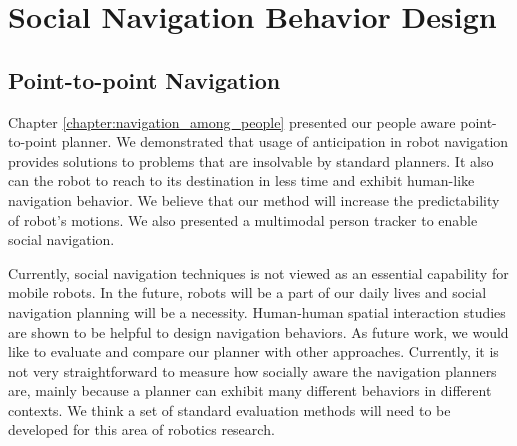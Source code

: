 \documentclass[12pt]{gatech-thesis}
\begin{document}





\section{Social Navigation Behavior Design}


\subsection{Point-to-point Navigation}

Chapter \ref{chapter:navigation_among_people} presented our people aware point-to-point planner. We demonstrated that usage of anticipation in robot navigation provides solutions to problems that are insolvable by standard planners. It also can the robot to
reach to its destination in less time and exhibit human-like navigation behavior. We believe that our method will increase the predictability of robot’s motions. We also presented a multimodal person tracker to enable social navigation.
	
	
Currently, social navigation techniques is not viewed as an essential capability for mobile robots. In the future, robots will be a part of our daily lives and social navigation planning will be a necessity. Human-human spatial interaction studies are shown to be helpful to design navigation behaviors. As future work, we would like to evaluate and compare our planner with other approaches. Currently, it is not very straightforward to measure how socially aware the navigation planners are, mainly because a planner can exhibit many different behaviors in different contexts. We think a set of standard evaluation methods will need to be developed for this area of robotics research.

\end{document}
